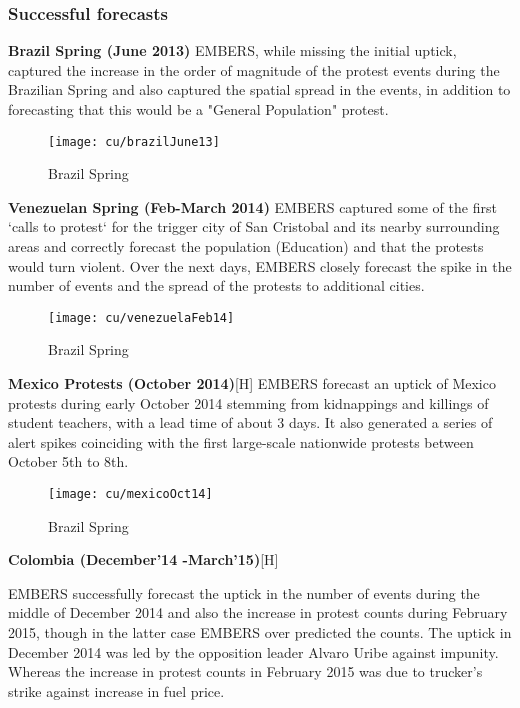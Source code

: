 \subsubsection{Successful forecasts}
\textbf{Brazil Spring (June 2013)}
EMBERS, while missing the initial uptick, captured the increase in the order of
magnitude of the protest events during the Brazilian Spring and also captured
the spatial spread in the events, in addition to forecasting that this would be
a "General Population" protest.
\begin{figure}[H]
\texttt{[image: cu/brazilJune13]}
\caption{Brazil Spring}
\label{fig:brazilJune13}
\end{figure}


\textbf{Venezuelan Spring (Feb-March 2014)}
EMBERS captured some of the first `calls to protest` for the trigger city of
San Cristobal and its nearby surrounding areas and correctly forecast the
population (Education) and that the protests would turn violent. Over the next
days, EMBERS closely forecast the spike in the number of events and the spread
of the protests to additional cities.
   
\begin{figure}[H]
\texttt{[image: cu/venezuelaFeb14]}
\caption{Brazil Spring}
\label{fig:venezuelaMarch14}
\end{figure}

\textbf{Mexico Protests (October 2014)}[H]
EMBERS forecast an uptick of Mexico protests during early October 2014 stemming
from kidnappings and killings of student teachers, with a lead time of about 3
days. It also generated  a series of alert spikes coinciding with the first
large-scale nationwide protests between October 5th to 8th.
\begin{figure}
\texttt{[image: cu/mexicoOct14]}
\caption{Brazil Spring}
\label{fig:mexicoOct14}
\end{figure}

\textbf{Colombia (December'14 -March'15)}[H]

EMBERS successfully forecast the uptick in the number of events during the
middle of December 2014 and also the increase in protest counts during February
2015, though in the latter case EMBERS over predicted the counts. The uptick in
December 2014 was led by the opposition leader Alvaro Uribe against impunity.
Whereas the increase in  protest counts in February 2015
was due to trucker’s strike against increase in fuel price.

